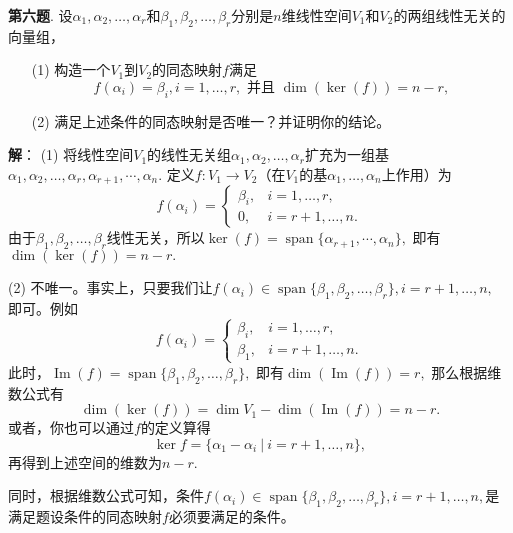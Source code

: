 \fi  %

\newpageorvspace

{\bf 第六题}. 设$\alpha_1, \alpha_2, \ldots, \alpha_r$和$\beta_1, \beta_2, \ldots, \beta_r$分别是$n$维线性空间$V_1$和$V_2$的两组线性无关的向量组，
\begin{itemize}
\item[(1)] 构造一个$V_1$到$V_2$的同态映射$f$满足
$$f(\alpha_i) = \beta_i, i = 1, \ldots, r, \text{ 并且 } \dim(\ker(f)) = n-r,$$
\item[(2)] 满足上述条件的同态映射是否唯一？并证明你的结论。
\end{itemize}

\ifIncludeAnswer

\newpageorvspace

{\bf 解}： (1) 将线性空间$V_1$的线性无关组$\alpha_1, \alpha_2, \ldots, \alpha_r$扩充为一组基$\alpha_1, \alpha_2, \ldots, \alpha_r, \alpha_{r+1}, \cdots, \alpha_n.$ 定义$f: V_1 \rightarrow V_2$（在$V_1$的基$\alpha_1, \ldots, \alpha_n$上作用）为
$$
f(\alpha_i) = \begin{cases}
\beta_i, & i = 1, \ldots, r, \\
0, & i = r+1, \ldots, n.
\end{cases}
$$
由于$\beta_1, \beta_2, \ldots, \beta_r$线性无关，所以$\ker(f) = \operatorname{span}\{ \alpha_{r+1}, \cdots, \alpha_n \},$ 即有$\dim(\ker(f)) = n-r.$

(2) 不唯一。事实上，只要我们让$f(\alpha_i) \in \operatorname{span} \{ \beta_1, \beta_2, \ldots, \beta_r \}, i = r+1, \ldots, n,$ 即可。例如
$$
f(\alpha_i) = \begin{cases}
\beta_i, & i = 1, \ldots, r, \\
\beta_1, & i = r+1, \ldots, n.
\end{cases}
$$
此时，$\operatorname{Im}(f) = \operatorname{span} \{ \beta_1, \beta_2, \ldots, \beta_r \},$ 即有$\dim(\operatorname{Im}(f)) = r,$ 那么根据维数公式有
$$\dim(\ker(f)) = \dim V_1 - \dim(\operatorname{Im}(f)) = n - r.$$
或者，你也可以通过$f$的定义算得
$$\ker f = \{ \alpha_1 - \alpha_i \ |\ i = r + 1, \ldots, n \},$$
再得到上述空间的维数为$n - r.$

同时，根据维数公式可知，条件$f(\alpha_i) \in \operatorname{span} \{ \beta_1, \beta_2, \ldots, \beta_r \}, i = r+1, \ldots, n,$是满足题设条件的同态映射$f$必须要满足的条件。

\fi  %


